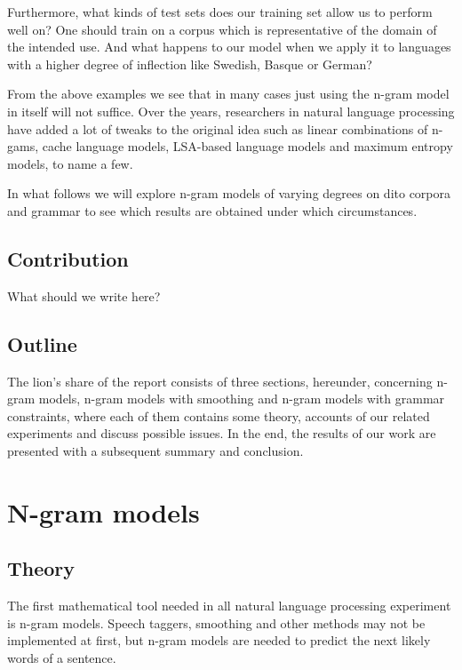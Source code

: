 \documentclass[a4paper,12pt]{article}
\begin{document}
Furthermore, what kinds of test sets does our training set allow us to perform well on? One should train on a  corpus which is representative of the domain of the intended use. And what happens to our model when we apply it to languages with a higher degree of inflection like Swedish, Basque or German?

From the above examples we see that in many cases just using the n-gram model in itself will not suffice. Over the years, researchers in natural language processing have added a lot of tweaks to the original idea such as linear combinations of n-gams, cache language models, LSA-based language models and maximum entropy models, to name a few.

In what follows we will explore n-gram models of varying degrees on dito corpora and grammar to see which results are obtained under which circumstances.

\subsection{Contribution}
What should we write here?

\subsection{Outline}
The lion's share of the report consists of three sections, hereunder, concerning n-gram models, n-gram models with smoothing and n-gram models with grammar constraints, where each of them contains some theory, accounts of our related experiments and discuss possible issues. In the end, the results of our work are presented with a subsequent summary and conclusion.

\section{N-gram models}
\label{sec:ngram}

\subsection{Theory}
The first mathematical tool needed in all natural language processing experiment is n-gram models. Speech taggers, smoothing and other methods may not be implemented at first, but n-gram models are needed to predict the next likely words of a sentence.
\end{document}
